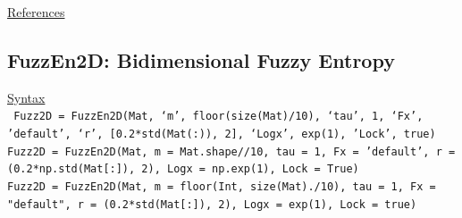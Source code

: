 \documentclass[12pt, a4paper, titlepage, openany]{book}
\begin{document}
\noindent \ul{References}\hspace{1cm}
\cite{Samp2D1}



\newpage
\subsection{\normalsize FuzzEn2D: \hspace{15mm} Bidimensional Fuzzy Entropy} \label{FuzzEn2D}
\noindent\ul{Syntax} \vspace{6mm} \\ \noindent \texttt{\footnotesize
Fuzz2D = FuzzEn2D(Mat, ‘m’, floor(size(Mat)/10), ‘tau’, 1, ‘Fx’, 'default', ‘r’, [0.2*std(Mat(:)), 2], ‘Logx’, exp(1), 'Lock', true)\\
Fuzz2D = FuzzEn2D(Mat, m = Mat.shape//10, tau = 1, Fx = 'default', r = (0.2*np.std(Mat[:]), 2), Logx = np.exp(1), Lock = True)\\
Fuzz2D = FuzzEn2D(Mat, m = floor(Int, size(Mat)./10), tau = 1, Fx = "default", r = (0.2*std(Mat[:]), 2), Logx = exp(1), Lock = true)}
\end{document}
